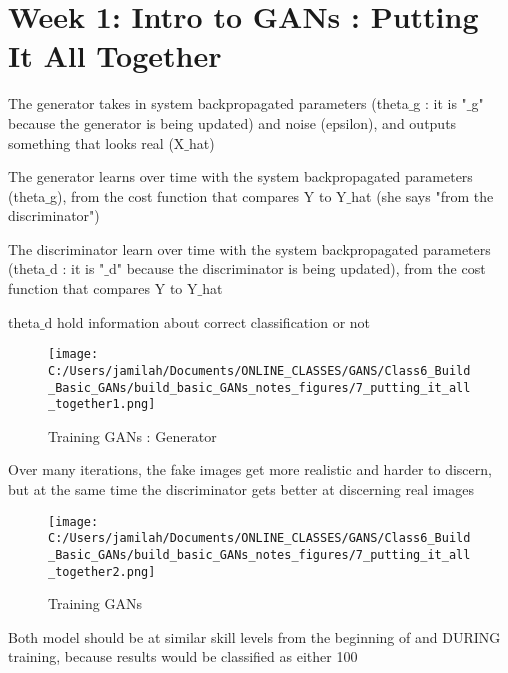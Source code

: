 \documentclass[11pt, onecolumn]{article}
\begin{document}
\clearpage
\section{Week 1: Intro to GANs : Putting It All Together}

The generator takes in system backpropagated parameters (theta$\_$g : it is "$\_$g" because the generator is being updated) and noise (epsilon), and outputs something that looks real (X$\_$hat)

The generator learns over time with the system backpropagated parameters (theta$\_$g), from the cost function that compares Y to Y$\_$hat (she says "from the discriminator")

The discriminator learn over time with the system backpropagated parameters (theta$\_$d : it is "$\_$d" because the discriminator is being updated), from the cost function that compares Y to Y$\_$hat

theta$\_$d hold information about correct classification or not

\begin{figure}[htp]
\begin{center}
\texttt{[image: C:/Users/jamilah/Documents/ONLINE\_CLASSES/GANS/Class6\_Build\_Basic\_GANs/build\_basic\_GANs\_notes\_figures/7\_putting\_it\_all\_together1.png]}
\end{center}
\caption{Training GANs : Generator}
\label{7_putting_it_all_together1}
\end{figure}

Over many iterations, the fake images get more realistic and harder to discern, but at the same time the discriminator gets better at discerning real images

\begin{figure}[htp]
\begin{center}
\texttt{[image: C:/Users/jamilah/Documents/ONLINE\_CLASSES/GANS/Class6\_Build\_Basic\_GANs/build\_basic\_GANs\_notes\_figures/7\_putting\_it\_all\_together2.png]}
\end{center}
\caption{Training GANs}
\label{7_putting_it_all_together2}
\end{figure}

Both model should be at similar skill levels from the beginning of and DURING training, because results would be classified as either 100%
\end{document}

